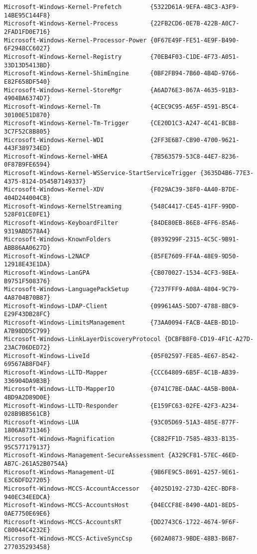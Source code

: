 \documentclass{report}
\begin{document}
\begin{lstlisting}[breaklines=true,basicstyle=\tiny]
Microsoft-Windows-Kernel-Prefetch        {5322D61A-9EFA-4BC3-A3F9-14BE95C144F8}
Microsoft-Windows-Kernel-Process         {22FB2CD6-0E7B-422B-A0C7-2FAD1FD0E716}
Microsoft-Windows-Kernel-Processor-Power {0F67E49F-FE51-4E9F-B490-6F2948CC6027}
Microsoft-Windows-Kernel-Registry        {70EB4F03-C1DE-4F73-A051-33D13D5413BD}
Microsoft-Windows-Kernel-ShimEngine      {0BF2FB94-7B60-4B4D-9766-E82F658DF540}
Microsoft-Windows-Kernel-StoreMgr        {A6AD76E3-867A-4635-91B3-4904BA6374D7}
Microsoft-Windows-Kernel-Tm              {4CEC9C95-A65F-4591-B5C4-30100E51D870}
Microsoft-Windows-Kernel-Tm-Trigger      {CE20D1C3-A247-4C41-BCB8-3C7F52C8B805}
Microsoft-Windows-Kernel-WDI             {2FF3E6B7-CB90-4700-9621-443F389734ED}
Microsoft-Windows-Kernel-WHEA            {7B563579-53C8-44E7-8236-0F87B9FE6594}
Microsoft-Windows-Kernel-WSService-StartServiceTrigger {3635D4B6-77E3-4375-8124-D545B7149337}
Microsoft-Windows-Kernel-XDV             {F029AC39-38F0-4A40-B7DE-404D244004CB}
Microsoft-Windows-KernelStreaming        {548C4417-CE45-41FF-99DD-528F01CE0FE1}
Microsoft-Windows-KeyboardFilter         {84DE80EB-86E8-4FF6-85A6-9319ABD578A4}
Microsoft-Windows-KnownFolders           {8939299F-2315-4C5C-9B91-ABB86AA0627D}
Microsoft-Windows-L2NACP                 {85FE7609-FF4A-48E9-9D50-12918E43E1DA}
Microsoft-Windows-LanGPA                 {CB070027-1534-4CF3-98EA-B9751F508376}
Microsoft-Windows-LanguagePackSetup      {7237FFF9-A08A-4804-9C79-4A8704B70B87}
Microsoft-Windows-LDAP-Client            {099614A5-5DD7-4788-8BC9-E29F43DB28FC}
Microsoft-Windows-LimitsManagement       {73AA0094-FACB-4AEB-BD1D-A7B98DD5C799}
Microsoft-Windows-LinkLayerDiscoveryProtocol {DCBFB8F0-CD19-4F1C-A27D-23AC706DED72}
Microsoft-Windows-LiveId                 {05F02597-FE85-4E67-8542-69567AB8FD4F}
Microsoft-Windows-LLTD-Mapper            {CCC64809-6B5F-4C1B-AB39-336904DA9B3B}
Microsoft-Windows-LLTD-MapperIO          {0741C7BE-DAAC-4A5B-B00A-4BD9A2D89D0E}
Microsoft-Windows-LLTD-Responder         {E159FC63-02FE-42F3-A234-028B9B8561CB}
Microsoft-Windows-LUA                    {93C05D69-51A3-485E-877F-1806A8731346}
Microsoft-Windows-Magnification          {C882FF1D-7585-4B33-B135-95C577179137}
Microsoft-Windows-Management-SecureAssessment {A329CF81-57EC-46ED-AB7C-261A52B0754A}
Microsoft-Windows-Management-UI          {9B6FE9C5-8691-4257-9E61-E3C6DFD27205}
Microsoft-Windows-MCCS-AccountAccessor   {4025D192-273D-42EC-BDF8-940EC34EEDCA}
Microsoft-Windows-MCCS-AccountsHost      {04ECCF8E-8490-4AD1-8ED5-0AE7750E69E6}
Microsoft-Windows-MCCS-AccountsRT        {DD2743C6-1722-4674-9F6F-C80044C4232E}
Microsoft-Windows-MCCS-ActiveSyncCsp     {602A0873-9BDE-48B3-B6B7-277035293458}

\end{lstlisting}
\end{document}
